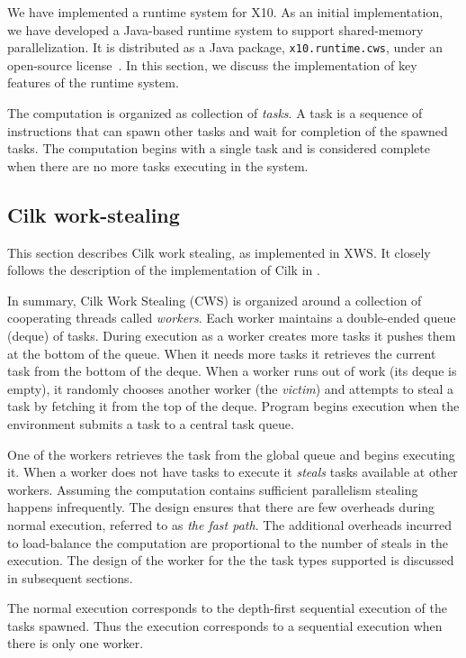 \documentclass[10pt]{article}
\numberwithin{equation}{section}
\newcommand{\java}{\tt}
\def\Xten{{\sf X10}}
\def\XWS{{\sf XWS}}
\begin{document}
We have implemented a runtime system for \Xten{}. 
As an initial implementation, we have developed a Java-based
runtime system to support shared-memory parallelization. It is
distributed as a Java package, {\java x10.runtime.cws}, under an
open-source license~\cite{x10-webpage}. In this section, we discuss the
implementation of key features of the runtime system.

The computation is organized as collection of {\em tasks}. A task is a
sequence of instructions that can spawn other tasks and wait for
completion of the spawned tasks. The computation begins with a single
task and is considered complete when there are no more tasks executing
in the system. 

\subsection{Cilk work-stealing}
This section describes Cilk work stealing, as implemented in \XWS. It
closely follows the description of the implementation of Cilk in
\cite{frigo98implementation}.

In summary, Cilk Work Stealing (CWS) is organized around a collection
of cooperating threads called {\em workers}. Each worker maintains a
double-ended queue (deque) of tasks. During execution as a worker
creates more tasks it pushes them at the bottom of the queue. When it
needs more tasks it retrieves the current task from the bottom of the
deque. When a worker runs out of work (its deque is empty), it
randomly chooses another worker (the {\em victim}) and attempts to
steal a task by fetching it from the top of the deque. Program begins
execution when the environment submits a task to a central task queue.

One of the workers retrieves the task from the global queue and begins
executing it. When a worker does not have tasks to execute it {\em steals}
tasks available at other workers. Assuming the computation contains
sufficient parallelism stealing happens infrequently. The design
ensures that there are few overheads during normal execution, referred
to as {\em the fast path}. The additional overheads incurred to load-balance
the computation are proportional to the number of steals in the
execution. The design of the worker for the the task types supported
is discussed in subsequent sections.

The normal execution corresponds to the depth-first sequential
execution of the tasks spawned. Thus the execution corresponds to a
sequential execution when there is only one worker.
\end{document}

